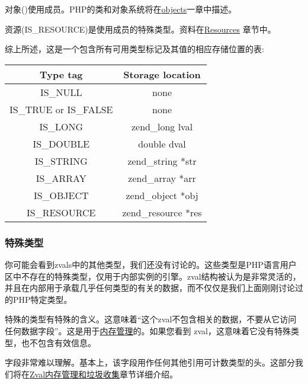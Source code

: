对象()使用成员。PHP的类和对象系统将在\href{http://www.phpinternalsbook.com/php7/internal_types/objects.html}{objects}一章中描述。

资源(IS\_RESOURCE)是使用成员的特殊类型。资料在\href{http://www.phpinternalsbook.com/php7/internal_types/zend_resources.html}{Resources}
章节中。

综上所述，这是一个包含所有可用类型标记及其值的相应存储位置的表:

\begin{tabular}{ | c | c | }
\hline
Type tag                     &	Storage location    \\
\hline
IS\_NULL	                 & none                 \\
\hline
IS\_TRUE or IS\_FALSE	     & none                 \\
\hline
IS\_LONG	                 & zend\_long lval     \\
\hline
IS\_DOUBLE                   & double dval         \\
\hline
IS\_STRING	                 & zend\_string *str   \\
\hline
IS\_ARRAY	                 & zend\_array *arr    \\
\hline
IS\_OBJECT	                 & zend\_object *obj   \\
\hline
IS\_RESOURCE	             & zend\_resource *res \\
\hline
\end{tabular}


\subsubsection{特殊类型}

你可能会看到zvals中的其他类型，我们还没有讨论的。这些类型是PHP语言用户区中不存在的特殊类型，仅用于内部实例的引擎。zval结构被认为是非常灵活的，并且在内部用于承载几乎任何类型的有关的数据，而不仅仅是我们上面刚刚讨论过的PHP特定类型。

特殊的类型有特殊的含义。这意味着“这个zval不包含相关的数据，不要从它访问任何数据字段”。这是用于\href{http://www.phpinternalsbook.com/php7/internal_types/zvals/memory_and_gc.html}{内存管理}的。如果您看到 zval，这意味着它没有特殊类型，也不包含有效信息。

字段非常难以理解。基本上，该字段用作任何其他引用可计数类型的头。这部分我们将在\href{http://www.phpinternalsbook.com/php7/internal_types/zvals/memory_and_gc.html}{Zval内存管理和垃圾收集}章节详细介绍。

